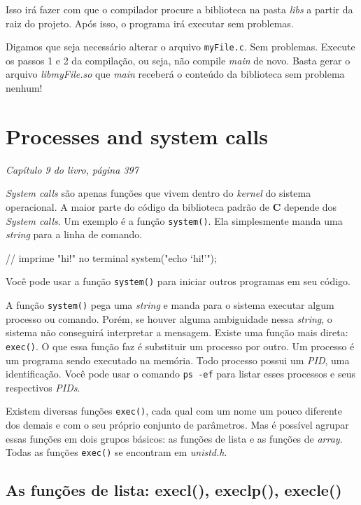 \documentclass[12pt, a4paper]{article}
\begin{document}
Isso irá fazer com que o compilador procure a biblioteca na pasta \textit{libs} a partir da raiz do projeto. Após isso, o programa irá executar sem problemas.

Digamos que seja necessário alterar o arquivo \verb|myFile.c|. Sem problemas. Execute os passos 1 e 2 da compilação, ou seja, não compile \textit{main} de novo. Basta gerar o arquivo \textit{libmyFile.so} que \textit{main} receberá o conteúdo da biblioteca sem problema nenhum!

\section{Processes and system calls}
\begin{flushright}
\textit{Capítulo 9 do livro, página 397}
\end{flushright}

\textit{System calls} são apenas funções que vivem dentro do \textit{kernel} do sistema operacional. A maior parte do código da biblioteca padrão de \textbf{C} depende dos \textit{System calls}. Um exemplo é a função \verb|system()|. Ela simplesmente manda uma \textit{string} para a linha de comando.\\

\begin{ccode}
// imprime "hi!" no terminal
system("echo `hi!'");
\end{ccode}

Você pode usar a função \verb|system()| para iniciar outros programas em seu código.

A função \verb|system()| pega uma \textit{string} e manda para o sistema executar algum processo ou comando. Porém, se houver alguma ambiguidade nessa \textit{string}, o sistema não conseguirá interpretar a mensagem. Existe uma função mais direta: \verb|exec()|. O que essa função faz é substituir um processo por outro. Um processo é um programa sendo executado na memória. Todo processo possui um \textit{PID}, uma identificação. Você pode usar o comando \verb|ps -ef| para listar esses processos e seus respectivos \textit{PIDs}.

Existem diversas funções \verb|exec()|, cada qual com um nome um pouco diferente dos demais e com o seu próprio conjunto de parâmetros. Mas é possível agrupar essas funções em dois grupos básicos: as funções de lista e as funções de \textit{array}. Todas as funções \verb|exec()| se encontram em \textit{unistd.h}.

\subsection{As funções de lista: execl(), execlp(), execle()}
\end{document}
